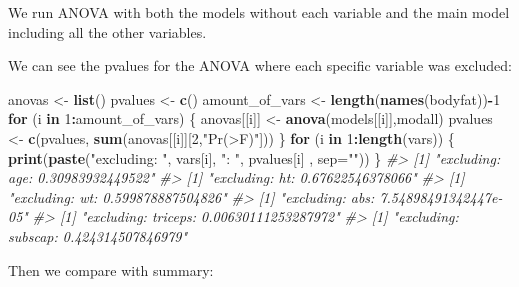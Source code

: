 \documentclass[]{article}
\newenvironment{Shaded}{\begin{snugshade}}{\end{snugshade}}
\newcommand{\CommentTok}[1]{\textcolor[rgb]{0.56,0.35,0.01}{\textit{#1}}}
\newcommand{\ControlFlowTok}[1]{\textcolor[rgb]{0.13,0.29,0.53}{\textbf{#1}}}
\newcommand{\DataTypeTok}[1]{\textcolor[rgb]{0.13,0.29,0.53}{#1}}
\newcommand{\DecValTok}[1]{\textcolor[rgb]{0.00,0.00,0.81}{#1}}
\newcommand{\KeywordTok}[1]{\textcolor[rgb]{0.13,0.29,0.53}{\textbf{#1}}}
\newcommand{\NormalTok}[1]{#1}
\newcommand{\OperatorTok}[1]{\textcolor[rgb]{0.81,0.36,0.00}{\textbf{#1}}}
\newcommand{\StringTok}[1]{\textcolor[rgb]{0.31,0.60,0.02}{#1}}
\begin{document}
We run ANOVA with both the models without each variable and the main
model including all the other variables.

We can see the pvalues for the ANOVA where each specific variable was
excluded:

\begin{Shaded}
\begin{Highlighting}[]
\NormalTok{anovas <-}\StringTok{ }\KeywordTok{list}\NormalTok{()}
\NormalTok{pvalues <-}\StringTok{ }\KeywordTok{c}\NormalTok{()}
\NormalTok{amount_of_vars <-}\StringTok{ }\KeywordTok{length}\NormalTok{(}\KeywordTok{names}\NormalTok{(bodyfat))}\OperatorTok{-}\DecValTok{1}
\ControlFlowTok{for}\NormalTok{ (i }\ControlFlowTok{in} \DecValTok{1}\OperatorTok{:}\NormalTok{amount_of_vars) \{}
\NormalTok{    anovas[[i]] <-}\StringTok{ }\KeywordTok{anova}\NormalTok{(models[[i]],modall)}
\NormalTok{    pvalues <-}\StringTok{ }\KeywordTok{c}\NormalTok{(pvalues, }\KeywordTok{sum}\NormalTok{(anovas[[i]][}\DecValTok{2}\NormalTok{,}\StringTok{"Pr(>F)"}\NormalTok{]))}
\NormalTok{\}}
\ControlFlowTok{for}\NormalTok{ (i }\ControlFlowTok{in} \DecValTok{1}\OperatorTok{:}\KeywordTok{length}\NormalTok{(vars)) \{}
    \KeywordTok{print}\NormalTok{(}\KeywordTok{paste}\NormalTok{(}\StringTok{"excluding: "}\NormalTok{, vars[i], }\StringTok{": "}\NormalTok{, pvalues[i] , }\DataTypeTok{sep=}\StringTok{""}\NormalTok{))}
\NormalTok{\}}
\CommentTok{#> [1] "excluding: age: 0.30983932449522"}
\CommentTok{#> [1] "excluding: ht: 0.67622546378066"}
\CommentTok{#> [1] "excluding: wt: 0.599878887504826"}
\CommentTok{#> [1] "excluding: abs: 7.54898491342447e-05"}
\CommentTok{#> [1] "excluding: triceps: 0.00630111253287972"}
\CommentTok{#> [1] "excluding: subscap: 0.424314507846979"}
\end{Highlighting}
\end{Shaded}

Then we compare with summary:

\begin{Shaded}
\end{Shaded}
\end{document}
